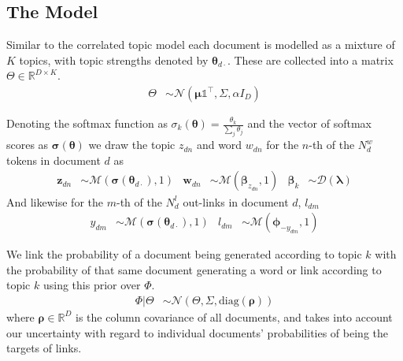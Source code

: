 \documentclass{sciposter}
\newcommand \T { ^\top }
\newcommand \vv[1] { \bm #1 }
\newcommand \diag[1] { \text{diag} \left( {#1} \right) }
\newcommand \wdn[0]  { { \vv{w}_{dn} } }
\newcommand \zdn[0]  { { \vv{z}_{dn} } }
\newcommand \mnor[3]  { \mathcal{N} \left(#1, #2, #3\right) }
\newcommand \muln[2]  { \mathcal{M} \left( {#1},{#2} \right) }
\newcommand \dir[1]   { \mathcal{D} \left( {#1} \right) }
\newcommand \dir[1]   { \mathcal{D} \left( {#1} \right) }
\newcommand \beta[1]  { \mathcal{B}eta \left( {#1}, {#2} \right) }
\newcommand \VReal[1] { { \mathbb{R}^{#1} } }
\newcommand \MReal[2] { { \mathbb{R}^{#1 \times #2} } }
\newcommand \one  {{  \mathds{1} }}
\newcommand \thdo { { \vv{\theta}_{d\cdot} } }
\begin{document}
\begin{multicols}{3}
\newcommand{\imsize}{0.45\columnwidth}
%


\section{The Model}




Similar to the correlated topic model\cite{Blei2006} each document is modelled as a mixture of $K$ topics, with topic strengths denoted by $\thdo$. These are collected into a matrix $\Theta \in \MReal{D}{K}$. 
\begin{align*}
\Theta &\sim \mnor{\vv{\mu}\one\T}{\Sigma}{\alpha I_D}
\end{align*}

Denoting the softmax function as $\sigma_k(\vv{\theta}) = \frac{\theta_k}{\sum_j \theta_j}$ and the vector of softmax scores as $\vv{\sigma}(\vv{\theta})$ we 
draw the topic $z_{dn}$ and word $w_{dn}$ for the $n$-th of the $N^w_d$ tokens in document $d$ as
\begin{align*}
\zdn & \sim \muln{\vv{\sigma}(\thdo)}{1} &
\wdn & \sim \muln{\vv{\beta}_{z_{dn}}}{1} &
\vv{\beta}_k & \sim \dir{\vv{\lambda}}
\end{align*}
And likewise for the $m$-th of the $N^l_d$ out-links in document $d$, $l_{dm}$
\begin{align*}
y_{dm} & \sim \muln{\vv{\sigma}(\thdo)}{1} &
l_{dm} & \sim \muln{\vv{\phi}_{- y_{dm}}}{1}
\end{align*}

We link the probability of a document being generated according to topic $k$ with the probability of that same document generating a word or link according to topic $k$ using this prior over $\Phi$.
\begin{align*}
\Phi|\Theta & \sim \mnor{\Theta}{\Sigma}{\diag{\vv{\rho}}}
\end{align*}
where $\vv{\rho} \in \VReal{D}$ is the column covariance of all documents, and takes into account our uncertainty with regard to individual documents' probabilities of being the targets of links.



\end{multicols}
\end{document}
